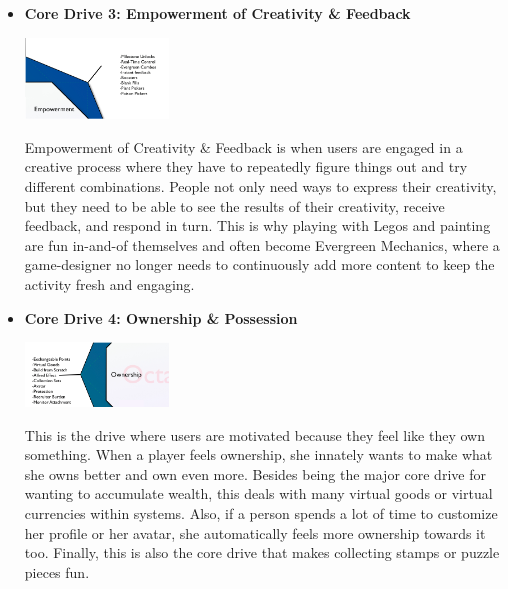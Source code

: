 \begin{itemize}
    \item \textbf{Core Drive 3: Empowerment of Creativity \& Feedback}
    \begin{center}
        \includegraphics[width= 0.3\textwidth]{images/core-drive-3-empowerment-of-creativith-and-feedback.png}
    \end{center}
  Empowerment of Creativity \& Feedback is when users are engaged in a creative process where they have to repeatedly figure things out and try different combinations. People not only need ways to express their creativity, but they need to be able to see the results of their creativity, receive feedback, and respond in turn. This is why playing with Legos and painting are fun in-and-of themselves and often become Evergreen Mechanics, where a game-designer no longer needs to continuously add more content to keep the activity fresh and engaging.
  
      \item \textbf{Core Drive 4: Ownership \& Possession}
    \begin{center}
        \includegraphics[width= 0.3\textwidth]{images/core-drive-4-ownership-and-possession.png}
    \end{center}
This is the drive where users are motivated because they feel like they own something. When a player feels ownership, she innately wants to make what she owns better and own even more. Besides being the major core drive for wanting to accumulate wealth, this deals with many virtual goods or virtual currencies within systems. Also, if a person spends a lot of time to customize her profile or her avatar, she automatically feels more ownership towards it too. Finally, this is also the core drive that makes collecting stamps or puzzle pieces fun.


\end{itemize}
